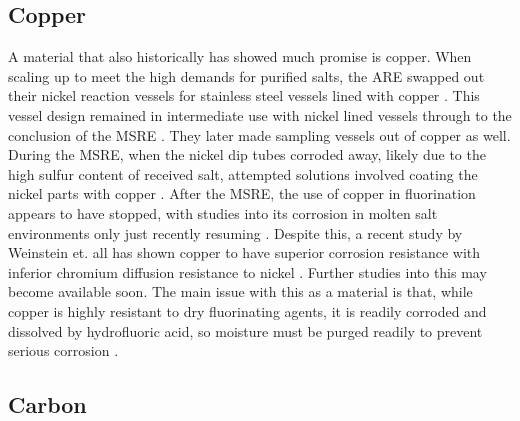\subsection{Copper}
\label{sec: copper}

A material that also historically has showed much promise is copper.
When scaling up to meet the high demands for purified salts, the
ARE swapped out their nickel reaction vessels for stainless steel vessels
lined with copper \cite{rev6}. This vessel design remained in intermediate
use with nickel lined vessels through to the conclusion of the MSRE
\cite{rev10,28}. They later made sampling vessels out of copper as well.
During the MSRE, when the nickel dip tubes corroded away, likely due to
the high sulfur content of received salt, attempted solutions involved
coating the nickel parts with copper \cite{rev28}. After the MSRE, the use of
copper in fluorination appears to have stopped, with studies into its
corrosion in molten salt environments only just recently resuming
\cite{rev60}. Despite this, a recent study by Weinstein et. all has shown
copper to have superior corrosion resistance with inferior chromium diffusion
resistance to nickel \cite{rev60}. Further studies into this may become
available soon. The main issue with this as a material is that, while copper
is highly resistant to dry fluorinating agents, it is readily corroded and
dissolved by hydrofluoric acid, so moisture must be purged readily to prevent
serious corrosion \cite{rev6}.

\subsection{Carbon}
\label{sec: carbon}

